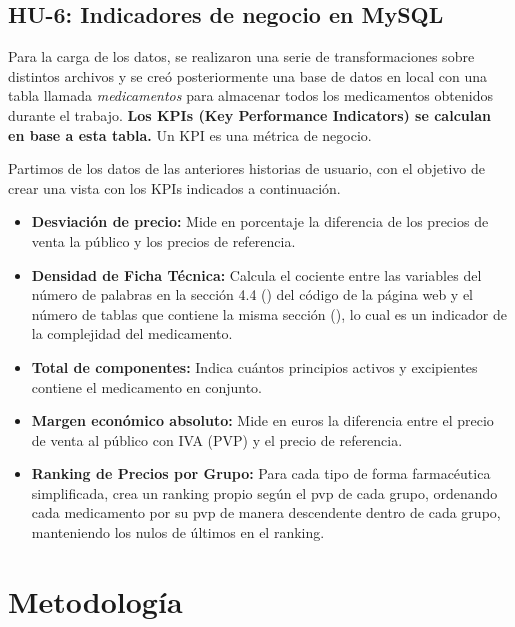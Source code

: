 \documentclass[11pt,a4paper]{article}
\begin{document}
\subsection{HU-6: Indicadores de negocio en MySQL}
Para la carga de los datos, se realizaron una serie de transformaciones sobre distintos archivos  y
se creó posteriormente una base de datos en local con una tabla llamada \textit{medicamentos} para
almacenar todos los medicamentos obtenidos durante el trabajo. \textbf{Los KPIs (Key Performance Indicators) se
calculan en base a esta tabla.} Un KPI es una métrica de negocio.

Partimos de los datos de las anteriores historias de usuario, con el objetivo de crear una vista con los KPIs indicados a continuación.
\begin{itemize}
  \item \textbf{Desviación de precio:} Mide en porcentaje la diferencia de los precios de venta la público y los precios de referencia.
  \item \textbf{Densidad de Ficha Técnica:} Calcula el cociente entre las variables del número de palabras en la sección 4.4 () del código de la página web y el número de tablas que contiene la misma sección (), lo cual es un indicador de la complejidad del medicamento.
  \item \textbf{Total de componentes:} Indica cuántos principios activos y excipientes contiene el medicamento en conjunto.
  \item \textbf{Margen económico absoluto:} Mide en euros la diferencia entre el precio de venta al público con IVA (PVP) y el precio de referencia.
  \item \textbf{Ranking de Precios por Grupo:} Para cada tipo de forma farmacéutica simplificada, crea un ranking propio según el pvp de cada grupo, ordenando cada medicamento por su pvp de manera descendente dentro de cada grupo, manteniendo los nulos de últimos en el ranking.
\end{itemize}
\newpage
\section{Metodología}
\end{document}
